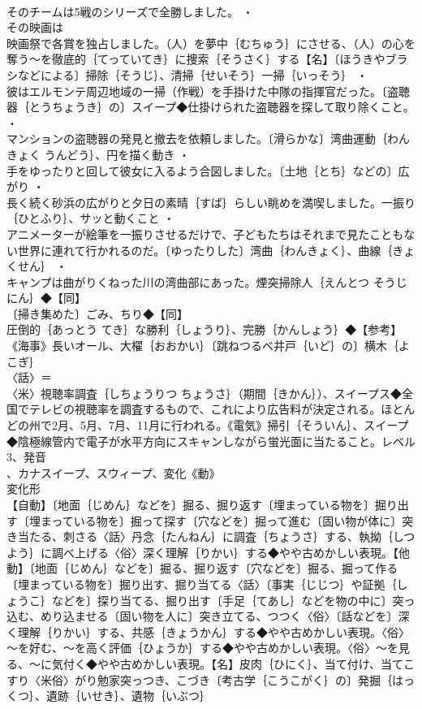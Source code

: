 \documentclass[8pt]{extreport}
\begin{document}
\begin{CJK}{UTF8}{min}
\\	そのチームは5戦のシリーズで全勝しました。 ・
\\	その映画は
\\	映画祭で各賞を独占しました。（人）を夢中｛むちゅう｝にさせる、（人）の心を奪う～を徹底的｛てっていてき｝に捜索｛そうさく｝する【名】〔ほうきやブラシなどによる〕掃除｛そうじ｝、清掃｛せいそう｝一掃｛いっそう｝ ・
\\	彼はエルモンテ周辺地域の一掃（作戦）を手掛けた中隊の指揮官だった。〔盗聴器｛とうちょうき｝の〕スイープ◆仕掛けられた盗聴器を探して取り除くこと。 ・
\\	マンションの盗聴器の発見と撤去を依頼しました。〔滑らかな〕湾曲運動｛わんきょく うんどう｝、円を描く動き ・
\\	手をゆったりと回して彼女に入るよう合図しました。〔土地｛とち｝などの〕広がり ・
\\	長く続く砂浜の広がりと夕日の素晴｛すば｝らしい眺めを満喫しました。一振り｛ひとふり｝、サッと動くこと ・
\\	アニメーターが絵筆を一振りさせるだけで、子どもたちはそれまで見たこともない世界に連れて行かれるのだ。〔ゆったりした〕湾曲｛わんきょく｝、曲線｛きょくせん｝ ・
\\	キャンプは曲がりくねった川の湾曲部にあった。煙突掃除人｛えんとつ そうじ にん｝◆【同】
\\	〔掃き集めた〕ごみ、ちり◆【同】
\\	圧倒的｛あっとう てき｝な勝利｛しょうり｝、完勝｛かんしょう｝◆【参考】
\\	《海事》長いオール、大櫂｛おおかい｝〔跳ねつるべ井戸｛いど｝の〕横木｛よこぎ｝
\\	〈話〉＝
\\	〈米〉視聴率調査｛しちょうりつ ちょうさ｝（期間｛きかん｝）、スイープス◆全国でテレビの視聴率を調査するもので、これにより広告料が決定される。ほとんどの州で2月、5月、7月、11月に行われる。《電気》掃引｛そういん｝、スイープ◆陰極線管内で電子が水平方向にスキャンしながら蛍光面に当たること。レベル3、発音
\\	、カナスイープ、スウィープ、変化《動》
\\	変化形 
\\	【自動】〔地面｛じめん｝などを〕掘る、掘り返す〔埋まっている物を〕掘り出す〔埋まっている物を〕掘って探す〔穴などを〕掘って進む〔固い物が体に〕突き当たる、刺さる〈話〉丹念｛たんねん｝に調査｛ちょうさ｝する、執拗｛しつよう｝に調べ上げる〈俗〉深く理解｛りかい｝する◆やや古めかしい表現。【他動】〔地面｛じめん｝などを〕掘る、掘り返す〔穴などを〕掘る、掘って作る〔埋まっている物を〕掘り出す、掘り当てる〈話〉〔事実｛じじつ｝や証拠｛しょうこ｝などを〕探り当てる、掘り出す〔手足｛てあし｝などを物の中に〕突っ込む、めり込ませる〔固い物を人に〕突き立てる、つつく〈俗〉〔話などを〕深く理解｛りかい｝する、共感｛きょうかん｝する◆やや古めかしい表現。〈俗〉～を好む、～を高く評価｛ひょうか｝する◆やや古めかしい表現。〈俗〉～を見る、～に気付く◆やや古めかしい表現。【名】皮肉｛ひにく｝、当て付け、当てこすり〈米俗〉がり勉家突っつき、こづき〔考古学｛こうこがく｝の〕発掘｛はっくつ｝、遺跡｛いせき｝、遺物｛いぶつ｝

\end{CJK}
\end{document}
